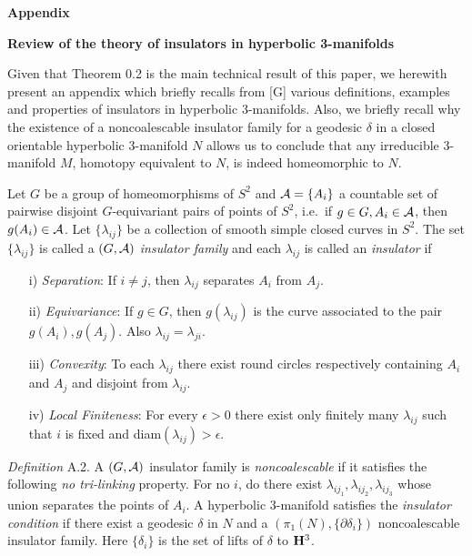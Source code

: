 \def\dcirc{\leavevmode\setbox0=\hbox{h}\dimen2=\ht0 \advance\dimen2
by-1ex\rlap{\raise.67\dimen2\hbox{\char'27}}D}
\def\ncirc{\leavevmode\setbox0=\hbox{h}\dimen2=\ht0 \advance\dimen2 by-1ex\rlap{\raise.67\dimen2\hbox{\char'27}}N}

\centerline{\bf Appendix}
\centerline{\bf Review of the theory of insulators in hyperbolic 3-manifolds}
 
Given that Theorem 0.2
is the main technical result of this paper, we herewith present an appendix
which
briefly recalls from [G] various definitions,  examples and properties of
insulators in hyperbolic 3-manifolds.  Also, we briefly recall  why
the existence of a noncoalescable insulator family for a geodesic $\delta$ in a
closed orientable hyperbolic 3-manifold $N$ allows us to conclude that  any
irreducible
3-manifold
$M$, homotopy equivalent to $N$, is indeed homeomorphic to $N$.

  Let $G$ be a group of homeomorphisms of
$S^2$ and ${\cal A}=\{A_i\}$ a countable set of pairwise disjoint $G$-equivariant
pairs of
points  of $S^2$, i.e.\ if  $g\in G, A_i\in {\cal A}$, then $g(A_i)\in {\cal
A}$.  Let $\{\lambda_{ij}\}$ be a collection of smooth simple closed curves
in $S^2$.  The set $\{\lambda_{ij}\}$ is called a $(G,{\cal A})$ {\it
insulator  family} and each $\lambda_{ij}$  is called an {\it insulator} if
\begin{itemize}
\item[i)] {\it Separation}: If $i\neq j$, then $\lambda_{ij}$ separates
$A_i$ from $A_j$.
\item[ii)]  {\it Equivariance}: If $g\in G$, then $g(\lambda_{ij})$ is the
curve
associated
to the pair $g(A_i),g(A_j)$.  Also $\lambda_{ij}=\lambda_{ji}.$

\item[iii)] {\it Convexity}: To each $\lambda_{ij}$ there exist round
circles respectively
containing
$A_i$ and $A_j$ and disjoint from $\lambda_{ij}$.

\item[iv)]  {\it Local Finiteness}: For every $\epsilon>0$ there exist only
finitely many $\lambda_{ij}$ such
that $i$ is fixed and diam$(\lambda_{ij})>\epsilon$.
\end{itemize}

\enddemo

\vglue-8pt
{\it Definition} A.2.   A $(G,{\cal A})$ insulator family is {\it
noncoalescable}
if it satisfies the following {\it no tri\/{\rm -}\/linking} property.  For no $i$,
do  there exist
$\lambda_{ij_1},\lambda_{ij_2},  \lambda_{ij_3}$ whose union separates the
points of
$A_i$.   A hyperbolic 3-manifold satisfies the {\it insulator condition} if
there
exist  a geodesic $\delta$ in $N$ and a
$(\pi_1(N),\{\partial\delta_i\})$
noncoalescable insulator family.   Here $\{\delta_i\}$ is the set of lifts of
$\delta$ to ${\bf H}^3$. \eject 

